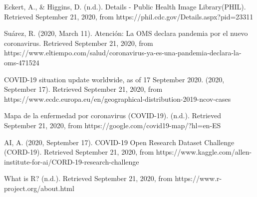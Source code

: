 \documentclass[10pt, a4paper]{article}
\begin{document}
\begin{thebibliography}{X}
 Eckert, A., \& Higgins, D. (n.d.). Details - Public Health Image Library(PHIL). Retrieved September 21, 2020, from https://phil.cdc.gov/Details.aspx?pid=23311

 Suárez, R. (2020, March 11). Atención: La OMS declara pandemia por el nuevo coronavirus. Retrieved September 21, 2020, from https://www.eltiempo.com/salud/coronavirus-ya-es-una-pandemia-declara-la-oms-471524
 
 COVID-19 situation update worldwide, as of 17 September 2020. (2020, September 17). Retrieved September 21, 2020, from https://www.ecdc.europa.eu/en/geographical-distribution-2019-ncov-cases 
 
 Mapa de la enfermedad por coronavirus (COVID-19). (n.d.). Retrieved September 21, 2020, from https://google.com/covid19-map/?hl=en-ES

 AI, A. (2020, September 17). COVID-19 Open Research Dataset Challenge (CORD-19). Retrieved September 21, 2020, from https://www.kaggle.com/allen-institute-for-ai/CORD-19-research-challenge

 What is R? (n.d.). Retrieved September 21, 2020, from https://www.r-project.org/about.html
 

\end{thebibliography}    
    
\clearpage

    
  
\end{document}
